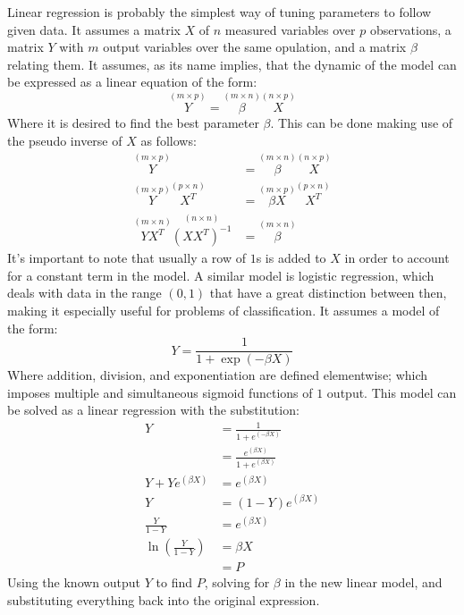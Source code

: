 \documentclass[journal]{IEEEtran}
\begin{document}
Linear regression is probably the simplest way of tuning parameters to follow
given data. It assumes a matrix $X$ of $n$ measured variables over $p$
observations, a matrix $Y$ with $m$ output variables over the same opulation,
and a matrix $\beta$ relating them. It assumes, as its name implies, that the
dynamic of the model can be expressed as a linear equation of the form: 
%
\begin{equation}\label{eq:linear}
    \overset{(m\times p)}{Y}
    = \overset{(m\times n)}{\beta} \overset{(n\times p)}{X}
\end{equation}
%
Where it is desired to find the best parameter $\beta$. This can be done making
use of the pseudo inverse of $X$ as follows:
%
\begin{align*}
    \overset{(m\times p)}{Y}
        &= \overset{(m\times n)}{\beta} \overset{(n\times p)}{X}\\
    \overset{(m\times p)}{Y}\overset{(p\times n)}{X^T}
        &= \overset{(m\times p)}{\beta X} \overset{(p\times n)}{X^T}\nonumber\\
    \overset{(m\times n)}{Y X^T} \overset{(n\times n)}{\left(X X^T\right)^{-1}}
        &= \overset{(m\times n)}{\beta}
\end{align*}
%
It's important to note that usually a row of $1$s is added to $X$ in order to
account for a constant term in the model. A similar model is logistic
regression, which deals with data in the range $(0, 1)$ that have a great
distinction between then, making it especially useful for problems of
classification. It assumes a model of the form:
%
\begin{equation}
    Y = \frac{1}{1+\exp{(-\beta X)}}
\end{equation}
%
Where addition, division, and exponentiation are defined elementwise; which
imposes multiple and simultaneous sigmoid functions of $1$ output. 
This model can be solved as a linear regression with the substitution:
%
\begin{align*}
    Y &= \frac{1}{1+e^{(-\beta X)}}\nonumber\\
        &= \frac{e^{(\beta X)}}{1+e^{(\beta X)}}\\
    Y+Ye^{(\beta X)}
        &= e^{(\beta X)}\\
    Y &= (1-Y) e^{(\beta X)}\\
    \frac{Y}{1-Y} &= e^{(\beta X)}\\
    \ln{\left(\frac{Y}{1-Y}\right)} &= \beta X\\
        &= P
\end{align*}
%
Using the known output $Y$ to find $P$, solving for $\beta$ in the new linear
model, and substituting everything back into the original expression.
\end{document}
